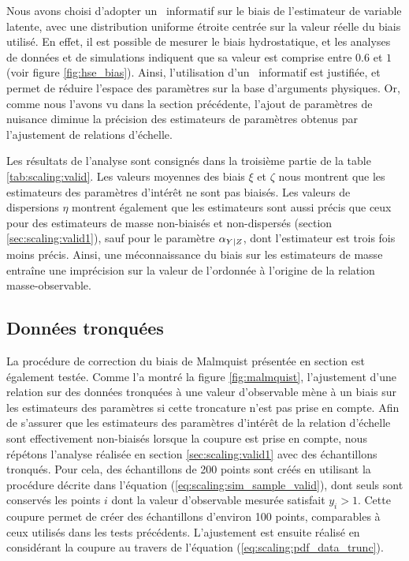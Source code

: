 Nous avons choisi d'adopter un \prior\ informatif sur le biais de l'estimateur de variable latente, avec une distribution uniforme étroite centrée sur la valeur réelle du biais utilisé.
En effet, il est possible de mesurer le biais hydrostatique, et les analyses de données et de simulations indiquent que sa valeur est comprise entre $0.6$ et $1$ (voir figure \ref{fig:hse_bias}).
Ainsi, l'utilisation d'un \prior\ informatif est justifiée, et permet de réduire l'espace des paramètres sur la base d'arguments physiques.
Or, comme nous l'avons vu dans la section précédente, l'ajout de paramètres de nuisance diminue la précision des estimateurs de paramètres obtenus par l'ajustement de relations d'échelle.

Les résultats de l'analyse sont consignés dans la troisième partie de la table \ref{tab:scaling:valid}.
Les valeurs moyennes des biais $\xi$ et $\zeta$ nous montrent que les estimateurs des paramètres d'intérêt ne sont pas biaisés.
Les valeurs de dispersions $\eta$ montrent également que les estimateurs sont aussi précis que ceux pour des estimateurs de masse non-biaisés et non-dispersés (section
\ref{sec:scaling:valid1}), sauf pour le paramètre $\alpha_{Y|Z}$, dont l'estimateur est trois fois moins précis.
Ainsi, une méconnaissance du biais sur les estimateurs de masse entraîne une imprécision sur la valeur de l'ordonnée à l'origine de la relation masse-observable.

\subsection{Données tronquées}
\label{sec:scaling:valid4}

La procédure de correction du biais de Malmquist présentée en section  est également testée.
Comme l'a montré la figure \ref{fig:malmquist}, l'ajustement d'une relation sur des données tronquées à une valeur d'observable mène à un biais sur les estimateurs des paramètres si cette troncature n'est pas prise en compte.
Afin de s'assurer que les estimateurs des paramètres d'intérêt de la relation d'échelle sont effectivement non-biaisés lorsque la coupure est prise en compte, nous répétons l'analyse réalisée en section \ref{sec:scaling:valid1} avec des échantillons tronqués.
Pour cela, des échantillons de 200 points sont créés en utilisant la procédure décrite dans l'équation (\ref{eq:scaling:sim_sample_valid}), dont seuls sont conservés les points $i$ dont la valeur d'observable mesurée satisfait $y_i > 1$.
Cette coupure permet de créer des échantillons d'environ 100 points, comparables à ceux utilisés dans les tests précédents.
L'ajustement est ensuite réalisé en considérant la coupure au travers de l'équation (\ref{eq:scaling:pdf_data_trunc}).

